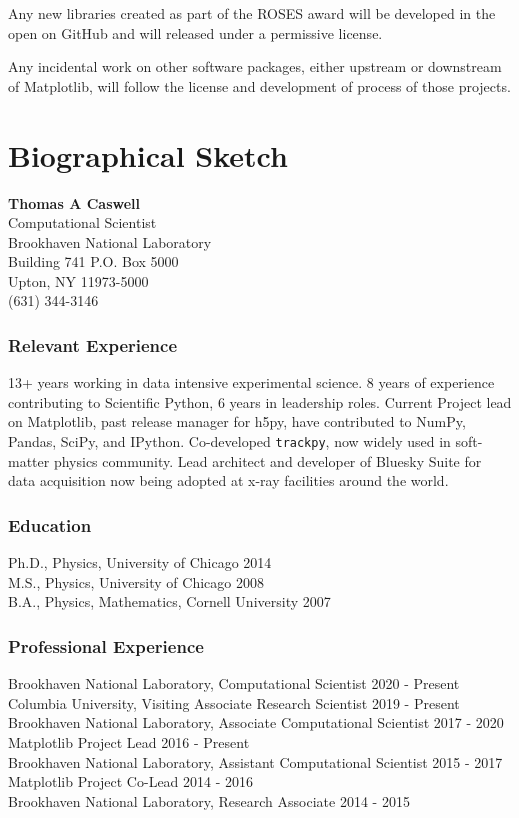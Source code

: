 \documentclass[12pt]{article}
\numberwithin{page}{section}
\begin{document}
Any new libraries created as part of the ROSES award will be developed
in the open on GitHub and will released under a permissive license.

Any incidental work on other software packages, either upstream or
downstream of Matplotlib, will follow the license and development of
process of those projects.


\newpage
\section{Biographical Sketch}
\setcounter{page}{1}
\begin{center}
  \textbf{Thomas A Caswell}\\
  Computational Scientist\\
  Brookhaven National Laboratory\\
  Building 741 P.O. Box 5000\\
  Upton, NY 11973-5000\\
  (631) 344-3146\\
\end{center}

\subsubsection*{Relevant Experience}
13+ years working in data intensive experimental science.  8 years of
experience contributing to Scientific Python, 6 years in leadership
roles.  Current Project lead on Matplotlib, past release manager for
h5py, have contributed to NumPy, Pandas, SciPy, and IPython.
Co-developed \texttt{trackpy}, now widely used in soft-matter physics
community.  Lead architect and developer of Bluesky Suite for data
acquisition now being adopted at x-ray facilities around the world.

\subsubsection*{Education}
Ph.D., Physics, University of Chicago \hfill 2014\\
M.S., Physics, University of Chicago \hfill 2008\\
B.A., Physics, Mathematics, Cornell University \hfill 2007

\subsubsection*{Professional Experience}
Brookhaven National Laboratory, Computational Scientist \hfill 2020 - Present\\
Columbia University, Visiting Associate Research Scientist \hfill 2019 - Present \\
Brookhaven National Laboratory, Associate Computational Scientist \hfill 2017 - 2020\\
Matplotlib Project Lead \hfill 2016 - Present\\
Brookhaven National Laboratory, Assistant Computational Scientist \hfill 2015 - 2017\\
Matplotlib Project Co-Lead \hfill 2014 - 2016\\
Brookhaven National Laboratory, Research Associate \hfill 2014 - 2015\\
\end{document}
